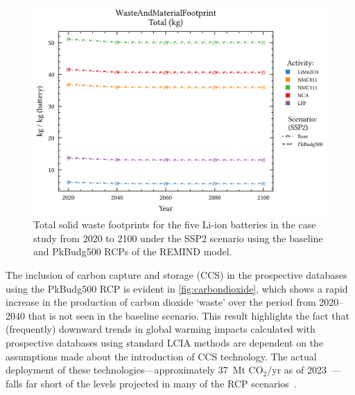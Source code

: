 \begin{figure}[H]
    \centering
    \includegraphics[width=\linewidth]{figures/total_waste.png}
    \caption{Total solid waste footprints for the five Li-ion batteries in the case study from 2020 to 2100 under the SSP2 scenario using the baseline and PkBudg500 RCPs of the REMIND model.}\label{fig:waste_total}
\end{figure}

The inclusion of carbon capture and storage (CCS) in the prospective databases using the PkBudg500 RCP is evident in \autoref{fig:carbondioxide}, which shows a rapid increase in the production of carbon dioxide `waste' over the period from 2020--2040 that is not seen in the baseline scenario. This result highlights the fact that (frequently) downward trends in global warming impacts calculated with prospective databases using standard LCIA methods are dependent on the assumptions made about the introduction of CCS technology. The actual deployment of these technologies---approximately 37~Mt CO$_2$/yr as of 2023~\citep{dziejarski2023ccs}---falls far short of the levels projected in many of the RCP scenarios~\citep{sacchi2023premisedocs}.  

